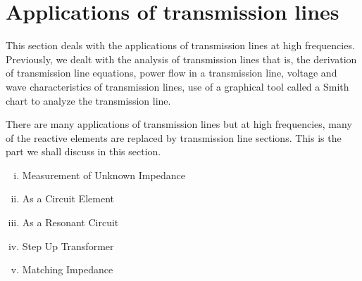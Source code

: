 \section{Applications of transmission lines}\label{lec:lec10}
This section deals with the applications of transmission lines at high frequencies. Previously, we dealt with the
analysis of transmission lines that is, the derivation of transmission line equations, power flow in a transmission line, voltage and wave characteristics of transmission lines, use of a graphical tool called a Smith chart to analyze the transmission line.

There are many applications of transmission lines but at high frequencies, many of the reactive elements are replaced by transmission line sections. This is the part we shall discuss in this section.
\begin{enumerate}[(i)]
\item Measurement of Unknown Impedance 
\item As a Circuit Element
\item As a Resonant Circuit
\item Step Up Transformer 
\item Matching Impedance
\end{enumerate}

